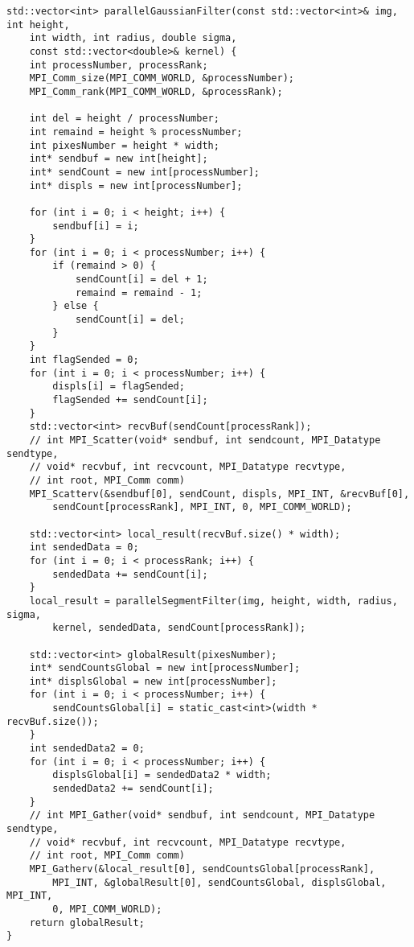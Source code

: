 \documentclass{report}
\begin{document}
\begin{lstlisting}
std::vector<int> parallelGaussianFilter(const std::vector<int>& img, int height,
    int width, int radius, double sigma,
    const std::vector<double>& kernel) {
    int processNumber, processRank;
    MPI_Comm_size(MPI_COMM_WORLD, &processNumber);
    MPI_Comm_rank(MPI_COMM_WORLD, &processRank);

    int del = height / processNumber;
    int remaind = height % processNumber;
    int pixesNumber = height * width;
    int* sendbuf = new int[height];
    int* sendCount = new int[processNumber];
    int* displs = new int[processNumber];

    for (int i = 0; i < height; i++) {
        sendbuf[i] = i;
    }
    for (int i = 0; i < processNumber; i++) {
        if (remaind > 0) {
            sendCount[i] = del + 1;
            remaind = remaind - 1;
        } else {
            sendCount[i] = del;
        }
    }
    int flagSended = 0;
    for (int i = 0; i < processNumber; i++) {
        displs[i] = flagSended;
        flagSended += sendCount[i];
    }
    std::vector<int> recvBuf(sendCount[processRank]);
    // int MPI_Scatter(void* sendbuf, int sendcount, MPI_Datatype sendtype,
    // void* recvbuf, int recvcount, MPI_Datatype recvtype,
    // int root, MPI_Comm comm)
    MPI_Scatterv(&sendbuf[0], sendCount, displs, MPI_INT, &recvBuf[0],
        sendCount[processRank], MPI_INT, 0, MPI_COMM_WORLD);

    std::vector<int> local_result(recvBuf.size() * width);
    int sendedData = 0;
    for (int i = 0; i < processRank; i++) {
        sendedData += sendCount[i];
    }
    local_result = parallelSegmentFilter(img, height, width, radius, sigma,
        kernel, sendedData, sendCount[processRank]);

    std::vector<int> globalResult(pixesNumber);
    int* sendCountsGlobal = new int[processNumber];
    int* displsGlobal = new int[processNumber];
    for (int i = 0; i < processNumber; i++) {
        sendCountsGlobal[i] = static_cast<int>(width * recvBuf.size());
    }
    int sendedData2 = 0;
    for (int i = 0; i < processNumber; i++) {
        displsGlobal[i] = sendedData2 * width;
        sendedData2 += sendCount[i];
    }
    // int MPI_Gather(void* sendbuf, int sendcount, MPI_Datatype sendtype,
    // void* recvbuf, int recvcount, MPI_Datatype recvtype,
    // int root, MPI_Comm comm)
    MPI_Gatherv(&local_result[0], sendCountsGlobal[processRank],
        MPI_INT, &globalResult[0], sendCountsGlobal, displsGlobal, MPI_INT,
        0, MPI_COMM_WORLD);
    return globalResult;
}

\end{lstlisting}
\end{document}
